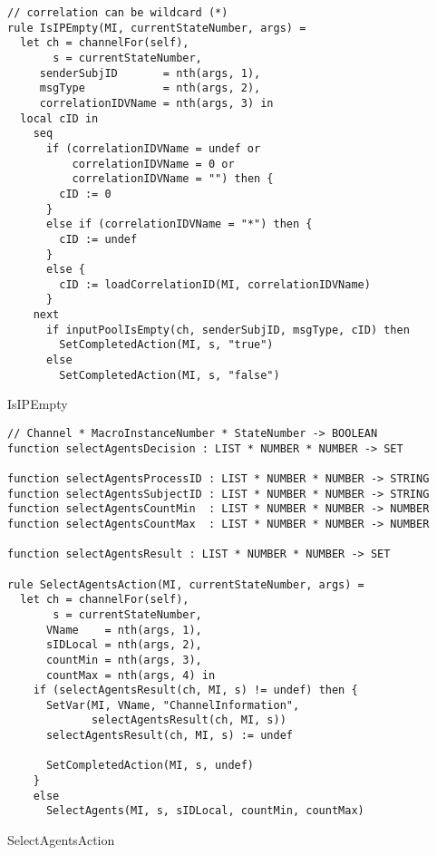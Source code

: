 \begin{listing}[H]
\begin{verbatim}
// correlation can be wildcard (*)
rule IsIPEmpty(MI, currentStateNumber, args) =
  let ch = channelFor(self),
       s = currentStateNumber,
     senderSubjID       = nth(args, 1),
     msgType            = nth(args, 2),
     correlationIDVName = nth(args, 3) in
  local cID in
    seq
      if (correlationIDVName = undef or
          correlationIDVName = 0 or
          correlationIDVName = "") then {
        cID := 0
      }
      else if (correlationIDVName = "*") then {
        cID := undef
      }
      else {
        cID := loadCorrelationID(MI, correlationIDVName)
      }
    next
      if inputPoolIsEmpty(ch, senderSubjID, msgType, cID) then
        SetCompletedAction(MI, s, "true")
      else
        SetCompletedAction(MI, s, "false")
\end{verbatim}
\caption{IsIPEmpty}
\label{lst:asm:IsIPEmpty}
\end{listing}




\begin{listing}[H]
\begin{verbatim}
// Channel * MacroInstanceNumber * StateNumber -> BOOLEAN
function selectAgentsDecision : LIST * NUMBER * NUMBER -> SET

function selectAgentsProcessID : LIST * NUMBER * NUMBER -> STRING
function selectAgentsSubjectID : LIST * NUMBER * NUMBER -> STRING
function selectAgentsCountMin  : LIST * NUMBER * NUMBER -> NUMBER
function selectAgentsCountMax  : LIST * NUMBER * NUMBER -> NUMBER

function selectAgentsResult : LIST * NUMBER * NUMBER -> SET

rule SelectAgentsAction(MI, currentStateNumber, args) =
  let ch = channelFor(self),
       s = currentStateNumber,
      VName    = nth(args, 1),
      sIDLocal = nth(args, 2),
      countMin = nth(args, 3),
      countMax = nth(args, 4) in
    if (selectAgentsResult(ch, MI, s) != undef) then {
      SetVar(MI, VName, "ChannelInformation",
             selectAgentsResult(ch, MI, s))
      selectAgentsResult(ch, MI, s) := undef

      SetCompletedAction(MI, s, undef)
    }
    else
      SelectAgents(MI, s, sIDLocal, countMin, countMax)
\end{verbatim}
\caption{SelectAgentsAction}
\label{lst:asm:SelectAgentsAction}
\end{listing}




